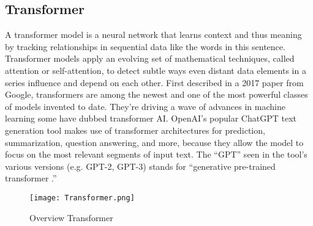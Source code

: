 \documentclass{ieeeojies}
\begin{document}
\subsection{Transformer}
A transformer model is a neural network that learns context and thus meaning by tracking relationships in sequential data like the words in this sentence. Transformer models apply an evolving set of mathematical techniques, called attention or self-attention, to detect subtle ways even distant data elements in a series influence and depend on each other. First described in a 2017 paper from Google, transformers are among the newest and one of the most powerful classes of models invented to date. They’re driving a wave of advances in machine learning some have dubbed transformer AI. OpenAI’s popular ChatGPT text generation tool makes use of transformer architectures for prediction, summarization, question answering, and more, because they allow the model to focus on the most relevant segments of input text. The “GPT” seen in the tool’s various versions (e.g. GPT-2, GPT-3) stands for “generative pre-trained transformer \cite{tai1}.”
\begin{figure} [H]
    \centering
    \texttt{[image: Transformer.png]}
    \caption{Overview Transformer}
    \label{fig:enter-label}
\end{figure}
\end{document}

